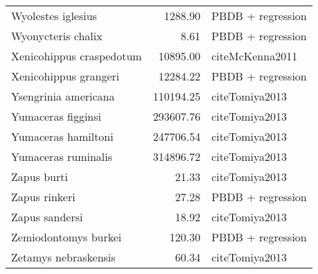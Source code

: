 \begin{table}[ht]
\begin{tabular}{lrl}
  Wyolestes iglesius & 1288.90 & PBDB + regression \\ 
  Wyonycteris chalix & 8.61 & PBDB + regression \\ 
  Xenicohippus craspedotum & 10895.00 & cite{McKenna2011} \\ 
  Xenicohippus grangeri & 12284.22 & PBDB + regression \\ 
  Ysengrinia americana & 110194.25 & cite{Tomiya2013} \\ 
  Yumaceras figginsi & 293607.76 & cite{Tomiya2013} \\ 
  Yumaceras hamiltoni & 247706.54 & cite{Tomiya2013} \\ 
  Yumaceras ruminalis & 314896.72 & cite{Tomiya2013} \\ 
  Zapus burti & 21.33 & cite{Tomiya2013} \\ 
  Zapus rinkeri & 27.28 & PBDB + regression \\ 
  Zapus sandersi & 18.92 & cite{Tomiya2013} \\ 
  Zemiodontomys burkei & 120.30 & PBDB + regression \\ 
  Zetamys nebraskensis & 60.34 & cite{Tomiya2013} \\ 
   \hline
\end{tabular}
\label{tab:mass_data}
\end{table}
